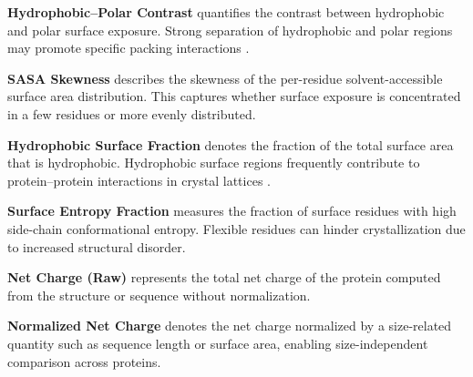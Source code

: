 \textbf{Hydrophobic–Polar Contrast} quantifies the contrast between hydrophobic and polar surface exposure. Strong separation of hydrophobic and polar regions may promote specific packing interactions \citep{Kramer2012}.

\textbf{SASA Skewness} describes the skewness of the per-residue solvent-accessible surface area distribution. This captures whether surface exposure is concentrated in a few residues or more evenly distributed.

\textbf{Hydrophobic Surface Fraction} denotes the fraction of the total surface area that is hydrophobic. Hydrophobic surface regions frequently contribute to protein–protein interactions in crystal lattices \citep{Kramer2012}.

\textbf{Surface Entropy Fraction} measures the fraction of surface residues with high side-chain conformational entropy. Flexible residues can hinder crystallization due to increased structural disorder.

\textbf{Net Charge (Raw)} represents the total net charge of the protein computed from the structure or sequence without normalization.

\textbf{Normalized Net Charge} denotes the net charge normalized by a size-related quantity such as sequence length or surface area, enabling size-independent comparison across proteins.